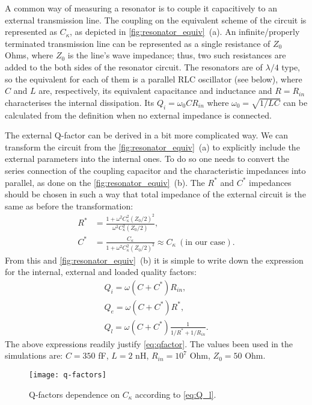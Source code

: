 A common way of measuring a resonator is to couple it capacitively to an external transmission line. The coupling on the equivalent scheme of the circuit is represented as $C_\kappa$, as depicted in \autoref{fig:resonator_equiv}~(a). An infinite/properly terminated transmission line can be represented as a single resistance of $Z_0$ Ohms, where $Z_0$ is the line's wave impedance; thus, two such resistances are added to the both sides of the resonator circuit. The resonators are of $\lambda/4$ type, so the equivalent for each of them is a parallel RLC oscillator (see below), where $C$ and $L$ are, respectively, its equivalent capacitance and inductance and $R=R_{in}$ characterises the internal dissipation. Its $Q_i  = \omega_0 C R_{in}$ where $\omega_0 = \sqrt{1/LC}$ can be calculated from the definition when no external impedance is connected.
 
The external Q-factor can be derived in a bit more complicated way\cite{Goppl2008}. We can transform the circuit from the \autoref{fig:resonator_equiv}~(a) to explicitly include the external parameters into the internal ones. To do so one needs to convert the series connection of the coupling capacitor and the characteristic impedances into parallel, as done on the \autoref{fig:resonator_equiv}~(b). The $R^*$ and $C^*$ impedances should be chosen in such a way that total impedance of the external circuit is the same as before the transformation:
\begin{align}
R^{*} &= \frac{1+\omega^2 C_\kappa^2 (Z_0/2)^2}{\omega^2 C_\kappa^2 (Z_0/2)	}, \\
C^{*} &= \frac{C_\kappa}{1+\omega^2 C_\kappa^2 (Z_0/2)^2} \approx C_\kappa\ (\text{in our case}). \label{eq:C_ast}
\end{align}
From this and \autoref{fig:resonator_equiv}~(b) it is simple to write down the expression for the internal, external and loaded quality factors:
\begin{gather}
Q_i =  \omega (C+C^{*}) R_{in}, \\
Q_e = \omega (C+C^{*}) R^{*}, \\
Q_l = \omega (C+C^{*})  \frac{1}{1/R^{*}+1/R_{in}}. \label{eq:Q_l}
\end{gather}
The above expressions readily justify \eqref{eq:qfactor}. The values been used in the simulations are: $C = 350$ fF, $L = 2$ nH, $R_{in}=10^7$ Ohm, $Z_0 = 50$ Ohm. 


\begin{figure}
\centering
\texttt{[image: q-factors]}
\caption{Q-factors dependence on $C_\kappa$ according to \eqref{eq:Q_l}.}
\end{figure}


